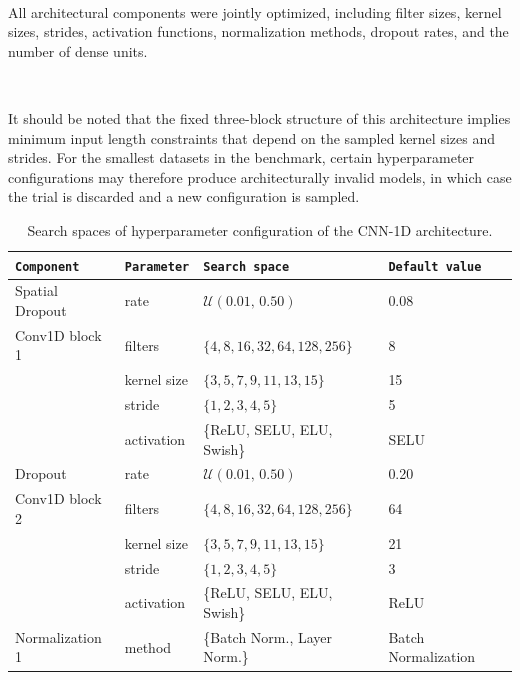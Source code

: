 \documentclass{article}
\renewcommand{\arraystretch}{1.12}
\begin{document}
~

All architectural components were jointly optimized, 
including filter sizes, kernel sizes, strides, activation functions, normalization methods, 
dropout rates, and the number of dense units.

~

It should be noted that the fixed three-block structure of this architecture implies minimum 
input length constraints that depend on the sampled kernel sizes and strides. For the smallest 
datasets in the benchmark, certain hyperparameter configurations may therefore produce 
architecturally invalid models, in which case the trial is discarded and a new configuration 
is sampled.



\begin{table}[!htbp]
\centering
\caption{Search spaces of hyperparameter configuration of the CNN-1D architecture.}
\label{tab:cnn1d_default}
\small
\renewcommand{\arraystretch}{1.2}
\begin{tabular}{llll}
\toprule
\texttt{Component} & \texttt{Parameter} & \texttt{Search space} & \texttt{Default value} \\
\midrule
Spatial Dropout      & rate          & $\mathcal{U}(0.01,\, 0.50)$         & 0.08 \\
\midrule
Conv1D block 1       & filters       & $\{4, 8, 16, 32, 64, 128, 256\}$        & 8 \\
                     & kernel size   & $\{3, 5, 7, 9, 11, 13, 15\}$        & 15 \\
                     & stride        & $\{1, 2, 3, 4, 5\}$        & 5 \\
                     & activation    & \{ReLU, SELU, ELU, Swish\}        & SELU \\
\midrule
Dropout              & rate          & $\mathcal{U}(0.01,\, 0.50)$        & 0.20 \\
\midrule
Conv1D block 2       & filters       & $\{4, 8, 16, 32, 64, 128, 256\}$        & 64 \\
                     & kernel size   & $\{3, 5, 7, 9, 11, 13, 15\}$        & 21 \\
                     & stride        & $\{1, 2, 3, 4, 5\}$        & 3 \\
                     & activation    & \{ReLU, SELU, ELU, Swish\}        & ReLU \\
\midrule                     
Normalization 1      & method        & \{Batch Norm., Layer Norm.\}        & Batch Normalization \\

\end{tabular}
\end{table}
\end{document}
